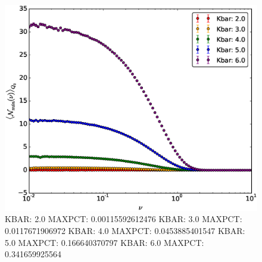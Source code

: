 \documentclass[10pt,letterpaper]{article}
\begin{document}
\begin{figure}[t] %
\centering %
\includegraphics[scale=0.45]{images/density_cutoff_compare_wide.eps} 
\caption{KBAR:  2.0   MAXPCT:  0.00115592612476
KBAR:  3.0   MAXPCT:  0.0117671906972
KBAR:  4.0   MAXPCT:  0.0453885401547
KBAR:  5.0   MAXPCT:  0.166640370797
KBAR:  6.0   MAXPCT:  0.341659925564
}
\label{fig:toy_e6_wide}
\end{figure}

\FloatBarrier
\end{document}
